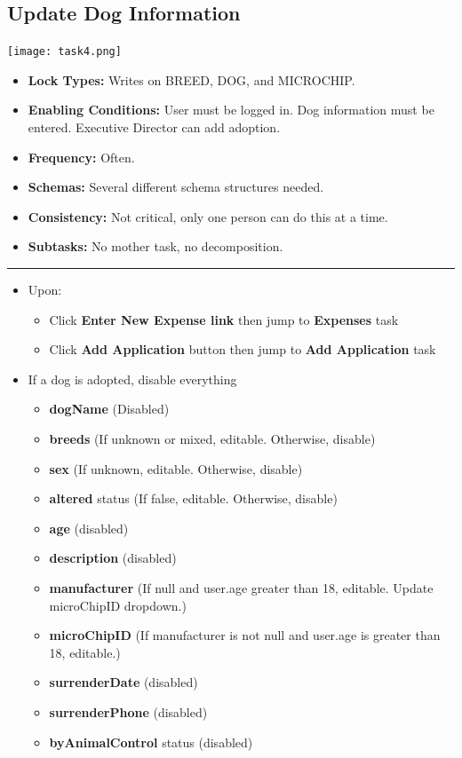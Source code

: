 \documentclass{article}
\begin{document}
\subsection{Update Dog Information}
\begin{center}
    \texttt{[image: task4.png]}
\end{center}
\begin{itemize}
    \item \textbf{Lock Types:} Writes on BREED, DOG, and MICROCHIP.
    \item \textbf{Enabling Conditions:} User must be logged in. Dog information must be entered. Executive Director can add adoption.
    \item \textbf{Frequency:} Often.
    \item \textbf{Schemas:} Several different schema structures needed.
    \item \textbf{Consistency:} Not critical, only one person can do this at a time.
    \item \textbf{Subtasks:} No mother task, no decomposition.
\end{itemize}
\noindent\rule{8cm}{0.4pt}
\begin{itemize}
    \item Upon:
    \begin{itemize}
        \item Click \textbf{Enter New Expense link} then jump to \textbf{Expenses} task
        \item Click \textbf{Add Application} button then jump to \textbf{Add Application} task
    \end{itemize}
    \item If a dog is adopted, disable everything
    \begin{itemize}
        \item \textbf{dogName} (Disabled)
        \item \textbf{breeds} (If unknown or mixed, editable. Otherwise, disable)
        \item \textbf{sex} (If unknown, editable. Otherwise, disable)
        \item \textbf{altered} status (If false, editable. Otherwise, disable)
        \item \textbf{age} (disabled)
        \item \textbf{description} (disabled)
        \item \textbf{manufacturer} (If null and user.age greater than 18, editable. Update microChipID dropdown.)
        \item \textbf{microChipID} (If manufacturer is not null and user.age is greater than 18, editable.)
        \item \textbf{surrenderDate} (disabled)
        \item \textbf{surrenderPhone} (disabled)
        \item \textbf{byAnimalControl} status (disabled)
    \end{itemize}
\end{itemize}
\end{document}
